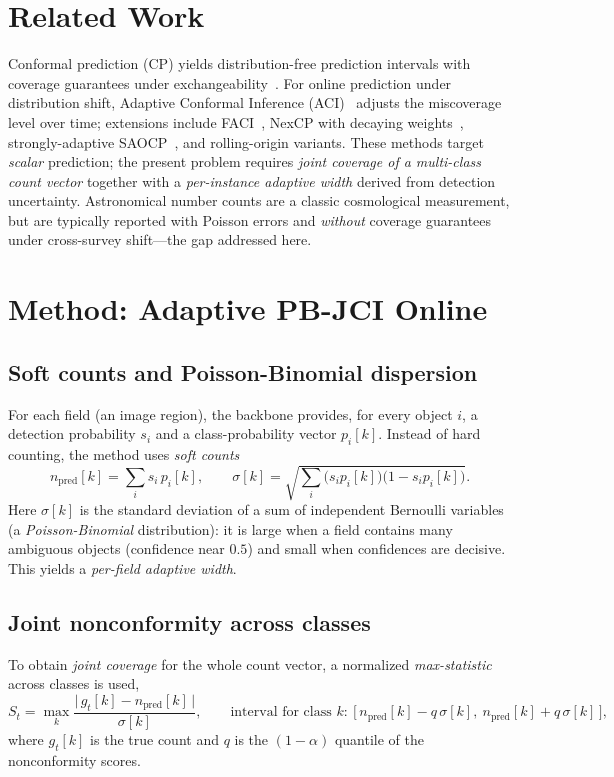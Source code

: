 \documentclass[pdflatex,sn-mathphys-num]{sn-jnl}%
\begin{document}
\section{Related Work}\label{sec:related}

Conformal prediction (CP) yields distribution-free prediction intervals with coverage guarantees under
exchangeability~\cite{vovk2005}. For online prediction under distribution shift, Adaptive Conformal
Inference (ACI)~\cite{gibbs2021} adjusts the miscoverage level over time; extensions include
FACI~\cite{gibbs2024}, NexCP with decaying weights~\cite{barber2023}, strongly-adaptive
SAOCP~\cite{bhatnagar2023}, and rolling-origin variants. These methods target \emph{scalar} prediction;
the present problem requires \emph{joint coverage of a multi-class count vector} together with a
\emph{per-instance adaptive width} derived from detection uncertainty. Astronomical number counts are a
classic cosmological measurement, but are typically reported with Poisson errors and \emph{without}
coverage guarantees under cross-survey shift---the gap addressed here.

\section{Method: Adaptive PB-JCI Online}\label{sec:method}

\subsection{Soft counts and Poisson-Binomial dispersion}
For each field (an image region), the backbone provides, for every object $i$, a detection probability
$s_i$ and a class-probability vector $p_i[k]$. Instead of hard counting, the method uses \emph{soft counts}
\begin{equation}
n_{\mathrm{pred}}[k]=\sum_i s_i\,p_i[k],\qquad
\sigma[k]=\sqrt{\sum_i \big(s_i p_i[k]\big)\big(1-s_i p_i[k]\big)}. \label{eq:soft}
\end{equation}
Here $\sigma[k]$ is the standard deviation of a sum of independent Bernoulli variables (a
\emph{Poisson-Binomial} distribution): it is large when a field contains many ambiguous objects
(confidence near $0.5$) and small when confidences are decisive. This yields a \emph{per-field adaptive
width}.

\subsection{Joint nonconformity across classes}
To obtain \emph{joint coverage} for the whole count vector, a normalized \emph{max-statistic}
across classes is used,
\begin{equation}
S_t=\max_k \frac{\big|\,g_t[k]-n_{\mathrm{pred}}[k]\,\big|}{\sigma[k]},\qquad
\text{interval for class }k:\ \big[\,n_{\mathrm{pred}}[k]-q\,\sigma[k],\ n_{\mathrm{pred}}[k]+q\,\sigma[k]\,\big], \label{eq:maxstat}
\end{equation}
where $g_t[k]$ is the true count and $q$ is the $(1-\alpha)$ quantile of the nonconformity scores.
\end{document}
